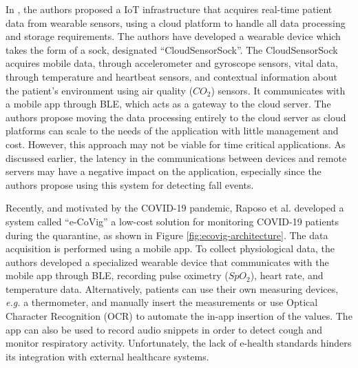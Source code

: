 In \cite{Doukas2012}, the authors proposed a \acs{IoT} infrastructure that acquires real-time patient data from wearable sensors, using a cloud platform to handle all data processing and storage requirements. The authors have developed a wearable device which takes the form of a sock, designated ``CloudSensorSock''. The CloudSensorSock acquires mobile data, through accelerometer and gyroscope sensors, vital data, through temperature and heartbeat sensors, and contextual information about the patient's environment using air quality ($CO_2$) sensors. It communicates with a mobile app through \acs{BLE}, which acts as a gateway to the cloud server. The authors propose moving the data processing entirely to the cloud server as cloud platforms can scale to the needs of the application with little management and cost. However, this approach may not be viable for time critical applications. As discussed earlier, the latency in the communications between devices and remote servers may have a negative impact on the application, especially since the authors propose using this system for detecting fall events. \bigskip

%
%

Recently, and motivated by the COVID-19 pandemic, Raposo et al. \cite{Raposo2021} developed a system called ``e-CoVig'' a low-cost solution for monitoring COVID-19 patients during the quarantine, as shown in Figure \ref{fig:ecovig-architecture}. The data acquisition is performed using a mobile app. To collect physiological data, the authors developed a specialized wearable device that communicates with the mobile app through \acs{BLE}, recording pulse oximetry ($SpO_2$), heart rate, and temperature data. Alternatively, patients can use their own measuring devices, \textit{e.g.} a thermometer, and manually insert the measurements or use Optical Character Recognition (OCR) to automate the in-app insertion of the values. The app can also be used to record audio snippets in order to detect cough and monitor respiratory activity. Unfortunately, the lack of e-health standards hinders its integration with external healthcare systems. 


